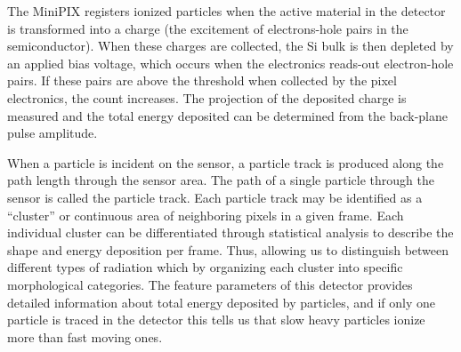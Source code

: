 The MiniPIX registers ionized particles when the active material in the detector is transformed into a charge (the excitement of electrons-hole pairs in the semiconductor). When these charges are collected, the Si bulk is then depleted by an applied bias voltage, which occurs when the electronics reads-out electron-hole pairs. If these pairs are above the threshold when collected by the pixel electronics, the count increases. The projection of the deposited charge is measured and the total energy deposited can be determined from the back-plane pulse amplitude. 

When a particle is incident on the sensor, a particle track is produced along the path length through the sensor area. The path of a single particle through the sensor is called the particle track.  Each particle track may be identified as a ``cluster'' or continuous area of neighboring pixels in a given frame. Each individual cluster can be differentiated through statistical analysis to describe the shape and energy deposition per frame. Thus, allowing us to distinguish between different types of radiation which by organizing each cluster into specific morphological categories. The feature parameters of this detector provides detailed information about total energy deposited by particles, and if only one particle is traced in the detector this tells us that slow heavy particles ionize more than fast moving ones. 

